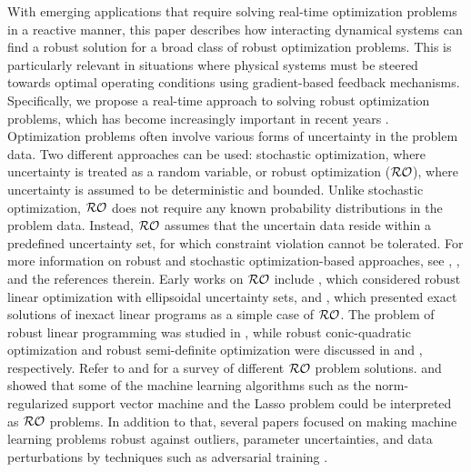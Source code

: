\documentclass[journal,twoside,web]{ieeecolor}
\begin{document}
With emerging applications that require solving real-time optimization problems in a reactive manner, this paper describes how interacting dynamical systems can find a robust solution for a broad class of robust optimization problems. This is particularly relevant in situations where physical systems must be steered towards optimal operating conditions using gradient-based feedback mechanisms. Specifically, we propose a real-time approach to solving robust optimization problems, which has become increasingly important in recent years \cite{he2022}. Optimization problems often involve various forms of uncertainty in the problem data. Two different approaches can be used: stochastic optimization, where uncertainty is treated as a random variable, or robust optimization (${\cal RO}$), where uncertainty is assumed to be deterministic and bounded. Unlike stochastic optimization, ${\cal RO}$ does not require any known probability distributions in the problem data. Instead, ${\cal RO}$ assumes that the uncertain data reside within a predefined uncertainty set, for which constraint violation cannot be tolerated. For more information on robust and stochastic optimization-based approaches, see \cite{bental2009}, \cite{bertsimas2011}, and the references therein. Early works on ${\cal RO}$ include \cite{soyster1976}, which considered robust linear optimization with ellipsoidal uncertainty sets, and \cite{falk1976}, which presented exact solutions of inexact linear programs as a simple case of ${\cal RO}$. The problem of robust linear programming was studied in \cite{bental1999}, while robust conic-quadratic optimization and robust semi-definite optimization were discussed in \cite{bental2002} and \cite{bental1998}, respectively. Refer to \cite{bertsimas2011} and \cite{beyer2007} for a survey of different ${\cal RO}$ problem solutions. \cite{xu2009} and \cite{xu2010} showed that some of the machine learning algorithms such as the norm-regularized support vector machine and the Lasso problem could be interpreted as ${\cal RO}$ problems. In addition to that, several papers focused on making machine learning problems robust against outliers, parameter uncertainties, and data perturbations by techniques such as adversarial training \cite{lanckriet2003, bhattacharyya2004a, bhattacharyya2004b, trafalis2007, namkoong2016, sinha2018, esfandiari2019}.
\end{document}
